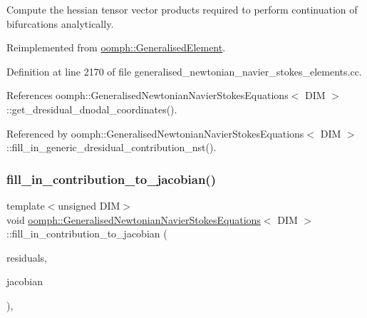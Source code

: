 Compute the hessian tensor vector products required to perform continuation of bifurcations analytically. 



Reimplemented from \hyperlink{classoomph_1_1GeneralisedElement_a94e118d65f31ce404963509e462b2d0e}{oomph\+::\+Generalised\+Element}.



Definition at line 2170 of file generalised\+\_\+newtonian\+\_\+navier\+\_\+stokes\+\_\+elements.\+cc.



References oomph\+::\+Generalised\+Newtonian\+Navier\+Stokes\+Equations$<$ D\+I\+M $>$\+::get\+\_\+dresidual\+\_\+dnodal\+\_\+coordinates().



Referenced by oomph\+::\+Generalised\+Newtonian\+Navier\+Stokes\+Equations$<$ D\+I\+M $>$\+::fill\+\_\+in\+\_\+generic\+\_\+dresidual\+\_\+contribution\+\_\+nst().

\mbox{\label{classoomph_1_1GeneralisedNewtonianNavierStokesEquations_a384bfd4f4b9b88af8f8a2eb100b2f6bb}} 
\subsubsection{\texorpdfstring{fill\+\_\+in\+\_\+contribution\+\_\+to\+\_\+jacobian()}{fill\_in\_contribution\_to\_jacobian()}}
{\footnotesize\ttfamily template$<$unsigned D\+IM$>$ \\
void \hyperlink{classoomph_1_1GeneralisedNewtonianNavierStokesEquations}{oomph\+::\+Generalised\+Newtonian\+Navier\+Stokes\+Equations}$<$ D\+IM $>$\+::fill\+\_\+in\+\_\+contribution\+\_\+to\+\_\+jacobian (\begin{DoxyParamCaption}\item[{\hyperlink{classoomph_1_1Vector}{Vector}$<$ double $>$ \&}]{residuals,  }\item[{\hyperlink{classoomph_1_1DenseMatrix}{Dense\+Matrix}$<$ double $>$ \&}]{jacobian }\end{DoxyParamCaption})\hspace{0.3cm}{\ttfamily [inline]}, {\ttfamily [virtual]}}



